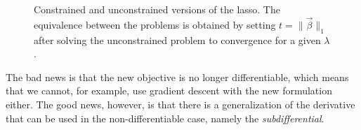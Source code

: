 \begin{figure}[tpb]
  \centering
  \hspace*{0.8cm}%
  \caption{%
    Constrained and unconstrained versions of the lasso. The equivalence between the problems is obtained by setting \(t = \lVert \vec{\beta}\rVert_1\) after solving the unconstrained problem to convergence for a given \(\lambda\).
  }
  \label{fig:constrained-unconstrained}
\end{figure}

The bad news is that the new objective is no longer differentiable, which means that we cannot, for example, use gradient descent with the new formulation either. The good news, however, is that there is a generalization of the derivative that can be used in the non-differentiable case, namely the \emph{subdifferential}.

